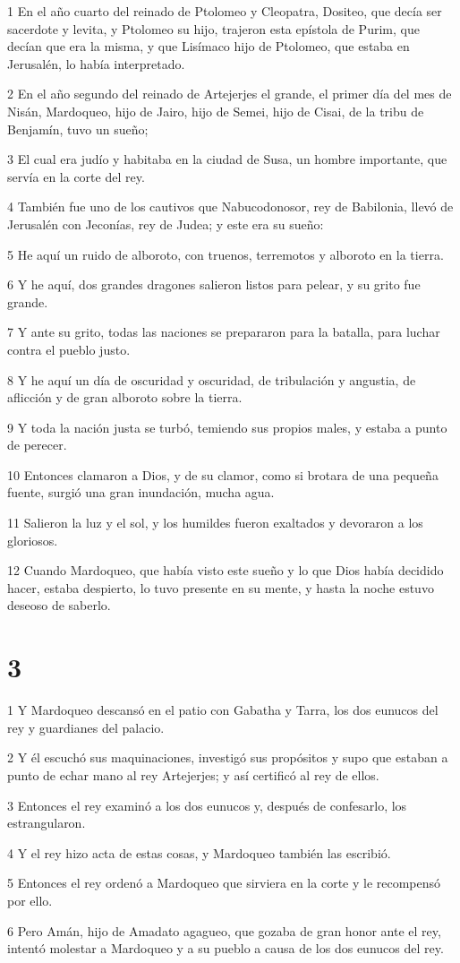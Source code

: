 \par 1 En el año cuarto del reinado de Ptolomeo y Cleopatra, Dositeo, que decía ser sacerdote y levita, y Ptolomeo su hijo, trajeron esta epístola de Purim, que decían que era la misma, y ​​que Lisímaco hijo de Ptolomeo, que estaba en Jerusalén, lo había interpretado.
\par 2 En el año segundo del reinado de Artejerjes el grande, el primer día del mes de Nisán, Mardoqueo, hijo de Jairo, hijo de Semei, hijo de Cisai, de la tribu de Benjamín, tuvo un sueño;
\par 3 El cual era judío y habitaba en la ciudad de Susa, un hombre importante, que servía en la corte del rey.
\par 4 También fue uno de los cautivos que Nabucodonosor, rey de Babilonia, llevó de Jerusalén con Jeconías, rey de Judea; y este era su sueño:
\par 5 He aquí un ruido de alboroto, con truenos, terremotos y alboroto en la tierra.
\par 6 Y he aquí, dos grandes dragones salieron listos para pelear, y su grito fue grande.
\par 7 Y ante su grito, todas las naciones se prepararon para la batalla, para luchar contra el pueblo justo.
\par 8 Y he aquí un día de oscuridad y oscuridad, de tribulación y angustia, de aflicción y de gran alboroto sobre la tierra.
\par 9 Y toda la nación justa se turbó, temiendo sus propios males, y estaba a punto de perecer.
\par 10 Entonces clamaron a Dios, y de su clamor, como si brotara de una pequeña fuente, surgió una gran inundación, mucha agua.
\par 11 Salieron la luz y el sol, y los humildes fueron exaltados y devoraron a los gloriosos.
\par 12 Cuando Mardoqueo, que había visto este sueño y lo que Dios había decidido hacer, estaba despierto, lo tuvo presente en su mente, y hasta la noche estuvo deseoso de saberlo.

\chapter{3}

\par 1 Y Mardoqueo descansó en el patio con Gabatha y Tarra, los dos eunucos del rey y guardianes del palacio.
\par 2 Y él escuchó sus maquinaciones, investigó sus propósitos y supo que estaban a punto de echar mano al rey Artejerjes; y así certificó al rey de ellos.
\par 3 Entonces el rey examinó a los dos eunucos y, después de confesarlo, los estrangularon.
\par 4 Y el rey hizo acta de estas cosas, y Mardoqueo también las escribió.
\par 5 Entonces el rey ordenó a Mardoqueo que sirviera en la corte y le recompensó por ello.
\par 6 Pero Amán, hijo de Amadato agagueo, que gozaba de gran honor ante el rey, intentó molestar a Mardoqueo y a su pueblo a causa de los dos eunucos del rey.

